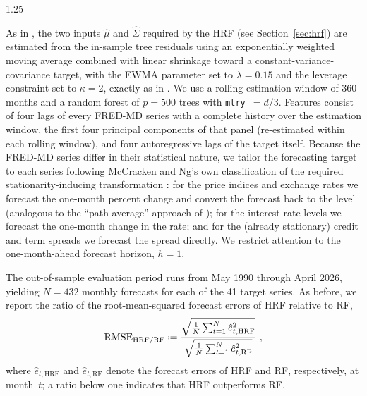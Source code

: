 \documentclass[12pt]{article}
\newcommand*{\defeq}{\mathrel{\vcenter{\baselineskip0.5ex\lineskiplimit0pt\hbox{\scriptsize.}\hbox{\scriptsize.}}}=}
\numberwithin{equation}{section}
\theoremstyle{plain}
\begin{document}
\begin{spacing}{1.25}
{As in \cite{beck:wolf:hrf-inf}, the two inputs $\hat\mu$ and $\hat\Sigma$ required by the HRF (see Section~\ref{sec:hrf}) are estimated from the in-sample tree residuals using an exponentially weighted moving average combined with linear shrinkage toward a constant-variance-covariance target, with the EWMA parameter set to $\lambda=0.15$ and the leverage constraint set to $\kappa=2$, exactly as in \cite{beck:wolf:hrf-inf}. We use a rolling estimation window of 360 months and a random forest of $p=500$ trees with \texttt{mtry}~$=d/3$. Features consist of four lags of every FRED-MD series with a complete history over the estimation window, the first four principal components of that panel (re-estimated within each rolling window), and four autoregressive lags of the target itself. Because the FRED-MD series differ in their statistical nature, we tailor the forecasting target to each series following McCracken and Ng's own classification of the required stationarity-inducing transformation \citep{mccracken:ng:2016}: for the price indices and exchange rates we forecast the one-month percent change and convert the forecast back to the level (analogous to the ``path-average'' approach of \cite{beck:wolf:hrf-inf}); for the interest-rate levels we forecast the one-month change in the rate; and for the (already stationary) credit and term spreads we forecast the spread directly. We restrict attention to the one-month-ahead forecast horizon, $h=1$.

The out-of-sample evaluation period runs from May 1990 through April 2026, yielding $N=432$ monthly forecasts for each of the 41 target series. As before, we report the ratio of the root-mean-squared forecast errors of HRF relative to RF,
\begin{equation}\label{eq:rmse-rat-fredmd}
\text{RMSE}_{\text{HRF}/\text{RF}} \defeq
  \frac{\sqrt{\frac{1}{N}\sum_{t=1}^N \hat e_{t,\text{HRF}}^2}}
       {\sqrt{\frac{1}{N}\sum_{t=1}^N \hat e_{t,\text{RF}}^2}}~,
\end{equation}
where $\hat e_{t,\text{HRF}}$ and $\hat e_{t,\text{RF}}$ denote the forecast errors of HRF and RF, respectively, at month~$t$; a ratio below one indicates that HRF outperforms RF.



}
\end{spacing}
\end{document}
